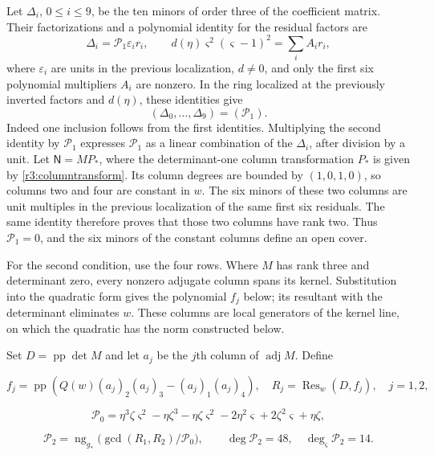 \documentclass[11pt,a4paper]{article}
\numberwithin{equation}{section}
\theoremstyle{plain}
\theoremstyle{definition}
\theoremstyle{remark}
\begin{document}
Let $\Delta_i$, $0\le i\le9$, be the ten minors of order three of
the coefficient matrix. Their factorizations and a polynomial identity
for the residual factors are
\[
 \Delta_i=\mathcal P_1\varepsilon_i r_i,\qquad
 d(\eta )\varsigma ^2(\varsigma -1)^2=\sum_i A_i r_i,
\]
where $\varepsilon_i$ are units in the previous localization, $d\ne0$,
and only the first six polynomial multipliers $A_i$ are nonzero.
In the ring localized at the previously inverted factors and $d(\eta )$, these identities
give
\[
 (\Delta_0,\ldots,\Delta_9)=(\mathcal P_1).
\]
Indeed one inclusion follows from the first identities. Multiplying
the second identity by $\mathcal P_1$ expresses $\mathcal P_1$ as a linear combination of
the $\Delta_i$, after division by a unit.
Let $\mathsf N=MP_*$, where the determinant-one column transformation $P_*$
is given by \eqref{r3:columntransform}. Its column degrees are bounded
by $(1,0,1,0)$, so columns two and four are constant in $w$.
The six minors of these two columns are unit multiples in the previous localization of the same first six residuals. The same
identity therefore proves that those two columns have rank two.
Thus $\mathcal P_1=0$, and the six minors of the constant columns define an open cover.

For the second condition, use the four rows. Where $M$ has
rank three and determinant zero, every nonzero adjugate column spans
its kernel. Substitution into the quadratic form gives the
polynomial $f_j$ below; its resultant with the determinant eliminates
$w$. These columns are local generators of the kernel line, on
which the quadratic has the norm constructed below.

Set
$D=\operatorname{pp}\det M$ and let $a_j$ be the $j$th column of
$\operatorname{adj}M$. Define

\begin{equation}f_j=\operatorname{pp}(Q(w)(a_j)_2(a_j)_3-(a_j)_1(a_j)_4),\quad R_j=\operatorname{Res}_w(D,f_j),\quad j=1,2,\end{equation}

\begin{equation}\mathcal P_0=\eta ^3\zeta \varsigma ^2-\eta \zeta ^3-\eta \zeta \varsigma ^2-2\eta ^2\varsigma +2\zeta ^2\varsigma +\eta \zeta ,\end{equation}

\begin{equation}\mathcal P_2=\operatorname{ng}_{g_*}\bigl(\gcd(R_1,R_2)/\mathcal P_0\bigr),\qquad \deg \mathcal P_2=48,\quad\deg_\varsigma \mathcal P_2=14.\end{equation}
\end{document}
